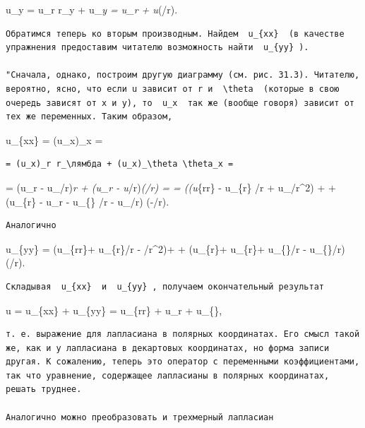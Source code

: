 \documentclass[
  ukrainian,
]{article}
\begin{document}
u\_y = u\_r r\_y + u\_\theta \theta\emph{y = u\_r \sin \theta +
u}\theta (\cos \theta/r).

\begin{verbatim}
Обратимся теперь ко вторым производным. Найдем  u_{xx}  (в качестве упражнения предоставим читателю возможность найти  u_{yy} ).

"Сначала, однако, построим другую диаграмму (см. рис. 31.3). Читателю, вероятно, ясно, что если u зависит от r и  \theta  (которые в свою очередь зависят от x и y), то  u_x  так же (вообще говоря) зависит от тех же переменных. Таким образом,
\end{verbatim}

u\_\{xx\} = (u\_x)\_x =

\begin{verbatim}
= (u_x)_r r_\лямбда + (u_x)_\theta \theta_x =
\end{verbatim}

= (u\_r \cos \theta - u\_\theta \sin \theta/r)\emph{r \cos \theta +
(u\_r \cos \theta - u}\theta \sin \theta/r)\emph{\theta (\sin \theta/r)
= = ((u}\{rr\} \cos \theta - u\_\{r\theta\} \sin \theta/r +
u\_\theta \sin \theta/r\^{}2) \cos \theta + + (u\_\{r\theta\}
\cos \theta - u\_r \sin \theta - u\_\{\theta\theta\} \sin \theta/r -
u\_\theta \cos \theta/r) (-\sin \theta/r).

\begin{verbatim}
Аналогично
\end{verbatim}

u\_\{yy\} = (u\_\{rr\}\sin\theta + u\_\{r\theta\}\cos\theta/r -
\cos\theta/r\^{}2)\sin\theta + + (u\_\{r\theta\}\sin\theta +
u\_\{r\}\cos\theta + u\_\{\theta\theta\}\cos\theta/r -
u\_\{\theta\}\sin\theta/r)(\cos\theta/r).

\begin{verbatim}
Складывая  u_{xx}  и  u_{yy} , получаем окончательный результат
\end{verbatim}

\Delta u = u\_\{xx\} + u\_\{yy\} = u\_\{rr\} +  u\_r +
 u\_\{\theta\theta\},

\begin{verbatim}
т. е. выражение для лапласиана в полярных координатах. Его смысл такой же, как и у лапласиана в декартовых координатах, но форма записи другая. К сожалению, теперь это оператор с переменными коэффициентами, так что уравнение, содержащее лапласианы в полярных координатах, решать труднее.

Аналогично можно преобразовать и трехмерный лапласиан
\end{verbatim}
\end{document}
